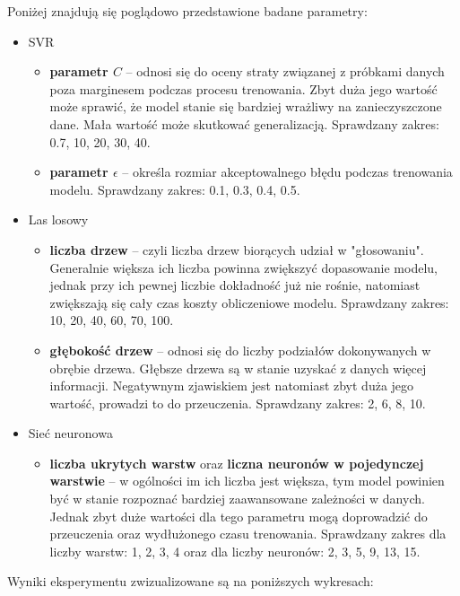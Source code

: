 Poniżej znajdują się poglądowo przedstawione badane parametry: 
\begin{itemize}[label=$\bullet$]
	\item SVR 
		\begin{itemize}[noitemsep,nolistsep]
			\item \textbf{parametr $C$} -- odnosi się do oceny straty związanej z próbkami danych poza marginesem podczas procesu trenowania.	Zbyt duża jego wartość może sprawić, że model stanie się bardziej wrażliwy na zanieczyszczone dane. Mała wartość może skutkować generalizacją. Sprawdzany zakres: 0.7, 10, 20, 30, 40.
			\item \textbf{parametr $\epsilon$} -- określa rozmiar akceptowalnego błędu podczas trenowania modelu. Sprawdzany zakres: 0.1, 0.3, 0.4, 0.5.
		\end{itemize}  
	
	\item Las losowy
	\begin{itemize}[noitemsep,nolistsep]
		\item \textbf{liczba drzew} -- czyli liczba drzew biorących udział w "głosowaniu". Generalnie większa ich liczba powinna  zwiększyć dopasowanie modelu, jednak przy ich pewnej liczbie dokładność już nie rośnie, natomiast zwiększają się cały czas koszty obliczeniowe modelu. Sprawdzany zakres: 10, 20, 40, 60, 70, 100.
		\item \textbf{głębokość drzew} -- odnosi się do liczby podziałów dokonywanych w obrębie drzewa. Głębsze drzewa są w stanie uzyskać z danych więcej informacji. Negatywnym zjawiskiem jest natomiast zbyt duża jego wartość, prowadzi to do przeuczenia. Sprawdzany zakres: 2, 6, 8, 10.
	\end{itemize}  
	
	\item Sieć neuronowa
	\begin{itemize}[noitemsep,nolistsep]
		\item \textbf{liczba ukrytych warstw} oraz \textbf{liczna neuronów w pojedynczej warstwie} -- w ogólności im ich liczba jest większa, tym model powinien być w stanie rozpoznać bardziej zaawansowane zależności w danych. Jednak zbyt duże wartości dla tego parametru mogą doprowadzić do przeuczenia oraz  wydłużonego czasu trenowania. Sprawdzany zakres dla liczby warstw: 1, 2, 3, 4 oraz dla liczby neuronów: 2, 3, 5, 9, 13, 15.
	\end{itemize}   
\end{itemize}

Wyniki eksperymentu zwizualizowane są na poniższych wykresach:

